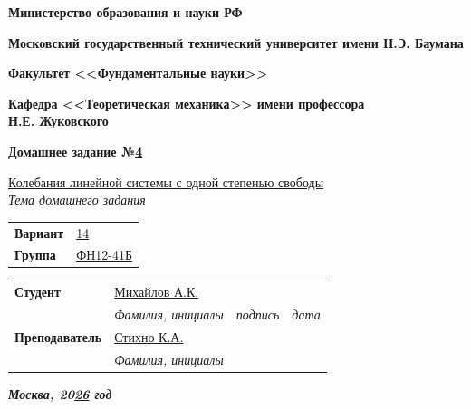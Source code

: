 \documentclass{article}
\begin{document}
\fontsize{14}{16}\selectfont

\begin{titlepage}
	\begin{flushleft}
		{\Large\textbf{Министерство образования и науки РФ}}
		
		\vspace{1cm}
		
		{\Large\textbf{Московский государственный технический университет имени Н.Э. Баумана}}
		
		\vspace{1cm}
		
		{\Large\textbf{Факультет <<Фундаментальные науки>>}}
		
		\vspace{1cm}
		
		{\Large\textbf{Кафедра <<Теоретическая механика>> имени профессора\\Н.Е. Жуковского}}
		
		\vspace{3cm}
		
		\textbf{\Large Домашнее задание №\underline{4}}
		
		\vspace{0.4cm}
		
		\underline{Колебания линейной системы с одной степенью свободы}\\[-1mm]
		
		{\normalsize \textit{Тема домашнего задания}}
		
		\vspace{1cm}
		
		\begin{tabular}{@{} p{2cm} p{3cm} @{}}
			\textbf{Вариант} & \underline{14} \tabularnewline[4mm]
			\textbf{Группа} & \underline{ФН12-41Б}
		\end{tabular}
		
		\vspace{2cm}
		
		\begin{tabular}{@{} p{3.8cm} p{5.4cm} p{2.5cm} p{3cm} @{}}
			\textbf{Студент} & \underline{Михайлов А.К.} & \hrulefill & \hrulefill \\[-1mm]
			
			& {\normalsize \textit{Фамилия, инициалы}} & {\normalsize \textit{подпись}} & {\normalsize \textit{дата}} \tabularnewline[6mm]
			
			\textbf{Преподаватель} & \underline{Стихно К.А.} & & \\[-1mm]
			
			& {\normalsize \textit{Фамилия, инициалы}} & &
		\end{tabular}
		
		\vfill
		
		\textbf{\textit{Москва, 20\underline{26} год}}
	\end{flushleft}
\end{titlepage}
\end{document}
